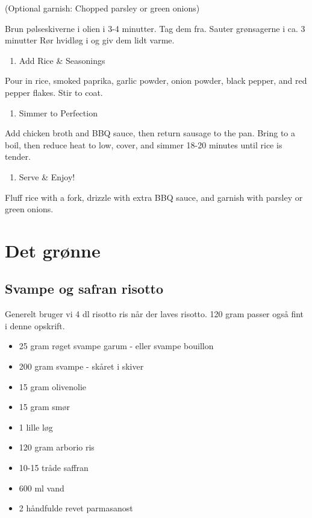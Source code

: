 \documentclass[
]{book}
\providecommand{\tightlist}{%
  \setlength{\itemsep}{0pt}\setlength{\parskip}{0pt}}
\begin{document}
(Optional garnish: Chopped parsley or green onions)

Brun pølseskiverne i olien i 3-4 minutter. Tag dem fra.
Sauter grønsagerne i ca. 3 minutter
Rør hvidløg i og giv dem lidt varme.

\begin{enumerate}
\def\labelenumi{\arabic{enumi}.}
\setcounter{enumi}{2}
\tightlist
\item
  Add Rice \& Seasonings
\end{enumerate}

Pour in rice, smoked paprika, garlic powder, onion powder, black pepper, and red pepper flakes. Stir to coat.

\begin{enumerate}
\def\labelenumi{\arabic{enumi}.}
\setcounter{enumi}{3}
\tightlist
\item
  Simmer to Perfection
\end{enumerate}

Add chicken broth and BBQ sauce, then return sausage to the pan.
Bring to a boil, then reduce heat to low, cover, and simmer 18-20 minutes until rice is tender.

\begin{enumerate}
\def\labelenumi{\arabic{enumi}.}
\setcounter{enumi}{4}
\tightlist
\item
  Serve \& Enjoy!
\end{enumerate}

Fluff rice with a fork, drizzle with extra BBQ sauce, and garnish with parsley or green onions.

\chapter{Det grønne}\label{det-gruxf8nne}

\section{Svampe og safran risotto}\label{svampe-og-safran-risotto}

Generelt bruger vi 4 dl risotto ris når der laves risotto.
120 gram passer også fint i denne opskrift.

\begin{itemize}
\tightlist
\item
  25 gram røget svampe garum - eller svampe bouillon
\item
  200 gram svampe - skåret i skiver
\item
  15 gram olivenolie
\item
  15 gram smør
\item
  1 lille løg
\item
  120 gram arborio ris
\item
  10-15 tråde saffran
\item
  600 ml vand
\item
  2 håndfulde revet parmasanost
\end{itemize}
\end{document}
